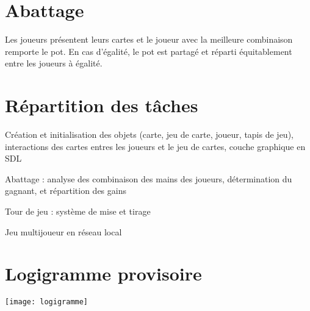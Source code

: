 \documentclass[12pt,a4paper]{article}
\begin{document}
\section{Abattage}
Les joueurs présentent leurs cartes et le joueur avec la meilleure combinaison remporte le pot. En cas d'égalité, le pot est partagé et réparti équitablement entre les joueurs à égalité.
\section{Répartition des tâches}
\begin{description}
\item[Romain : ]{Création et initialisation des objets (carte, jeu de carte, joueur, tapis de jeu), interactions des cartes entres les joueurs et le jeu de cartes, couche graphique en SDL}
\item[Tristan : ]{Abattage : analyse des combinaison des mains des joueurs, détermination du gagnant, et répartition des gains}
\item[William :]  {Tour de jeu : système de mise et tirage}
\item
\item[OPTIONEL : ]{Jeu multijoueur en réseau local}
\end{description}

\section{Logigramme provisoire}
\texttt{[image: logigramme]}
\end{document}
